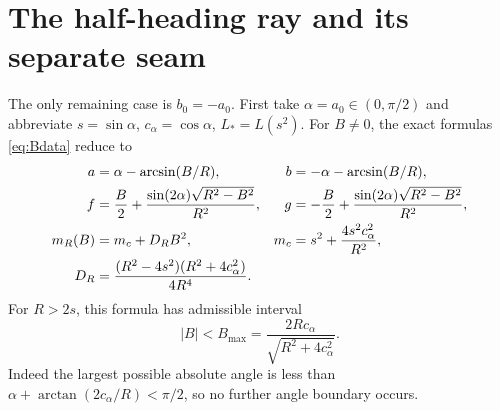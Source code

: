 \documentclass[11pt,a4paper]{article}
\theoremstyle{remark}\newtheorem{remark}[theorem]{Remark}
\begin{document}
\section{The half-heading ray and its separate seam}\label{sec:seam}

The only remaining case is $b_0=-a_0$. First take
$\alpha=a_0\in(0,\pi/2)$ and abbreviate $s=\sin\alpha$,
$c_\alpha=\cos\alpha$, $L_*=L(s^2)$.
For $B\ne0$, the exact formulas \eqref{eq:Bdata} reduce to
\begin{align}
 a&=\alpha-\arcsin(B/R),& b&=-\alpha-\arcsin(B/R),\notag\\
 f&=\frac B2+\frac{\sin(2\alpha)\sqrt{R^2-B^2}}{R^2},&
 g&=-\frac B2+\frac{\sin(2\alpha)\sqrt{R^2-B^2}}{R^2},\notag\\
 m_R(B)&=m_c+D_RB^2,&
 m_c&=s^2+\frac{4s^2c_\alpha^2}{R^2},\label{eq:raymod}\\
 D_R&=\frac{(R^2-4s^2)(R^2+4c_\alpha^2)}{4R^4}.&&\notag
\end{align}
For $R>2s$, this formula has admissible interval
\begin{equation}\label{eq:raydom}
 |B|<B_{\max}=\frac{2Rc_\alpha}{\sqrt{R^2+4c_\alpha^2}}.
\end{equation}
Indeed the largest possible absolute angle is less than
$\alpha+\arctan(2c_\alpha/R)<\pi/2$, so no further angle boundary occurs.
\end{document}
